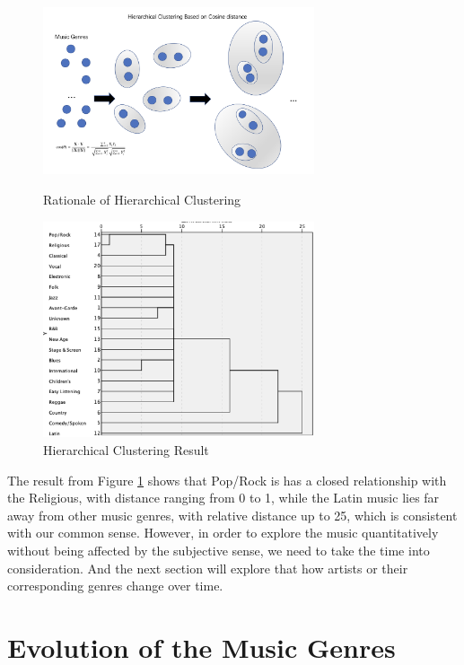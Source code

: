 \documentclass[12pt]{article}
\begin{document}
\begin{figure}[H]
\centering
\begin{minipage}[t]{0.48\textwidth}
\centering
\includegraphics[width=8cm]{figures/Q2_hclurationale.png}
\label{hclusterrationale}
\caption{Rationale of Hierarchical Clustering}
\end{minipage}
\begin{minipage}[t]{0.48\textwidth}
\centering
\includegraphics[width=8cm]{figures/Q2-hclustering.png}
\caption{Hierarchical Clustering Result}
\label{Hierarchical Clustering}
\end{minipage}
\end{figure}

The result from Figure \ref{Hierarchical Clustering} shows that Pop/Rock is has a closed relationship with the Religious, with distance ranging from 0 to 1, while the Latin music lies far away from other music genres, with relative distance up to 25, which is consistent with our common sense. However, in order to explore the music quantitatively without being affected by the subjective sense, we need to take the time into consideration. And the next section will explore that how artists or their corresponding genres change over time.

\section{Evolution of the Music Genres}
\end{document}
